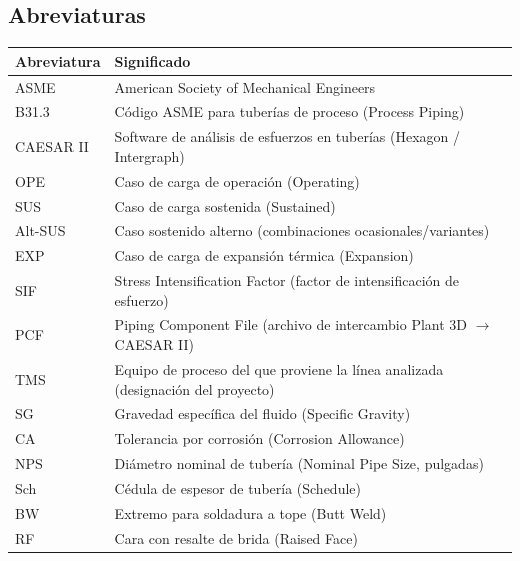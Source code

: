 \vspace{1cm}

\subsection*{Abreviaturas}

\noindent\begin{tabularx}{\textwidth}{@{}l>{\raggedright\arraybackslash}X@{}}
	\toprule
	\textbf{Abreviatura} & \textbf{Significado} \\
	\midrule
	ASME & American Society of Mechanical Engineers \\
	B31.3 & C\'{o}digo ASME para tuber\'{i}as de proceso (Process Piping) \\
	CAESAR II & Software de an\'{a}lisis de esfuerzos en tuber\'{i}as (Hexagon / Intergraph) \\
	OPE & Caso de carga de operaci\'{o}n (Operating) \\
	SUS & Caso de carga sostenida (Sustained) \\
	Alt-SUS & Caso sostenido alterno (combinaciones ocasionales/variantes) \\
	EXP & Caso de carga de expansi\'{o}n t\'{e}rmica (Expansion) \\
	SIF & Stress Intensification Factor (factor de intensificaci\'{o}n de esfuerzo) \\
	PCF & Piping Component File (archivo de intercambio Plant 3D $\rightarrow$ CAESAR II) \\
	TMS & Equipo de proceso del que proviene la l\'{i}nea analizada (designaci\'{o}n del proyecto) \\
	SG & Gravedad espec\'{i}fica del fluido (Specific Gravity) \\
	CA & Tolerancia por corrosi\'{o}n (Corrosion Allowance) \\
	NPS & Di\'{a}metro nominal de tuber\'{i}a (Nominal Pipe Size, pulgadas) \\
	Sch & C\'{e}dula de espesor de tuber\'{i}a (Schedule) \\
	BW & Extremo para soldadura a tope (Butt Weld) \\
	RF & Cara con resalte de brida (Raised Face) \\
	\bottomrule
\end{tabularx}

\newpage
